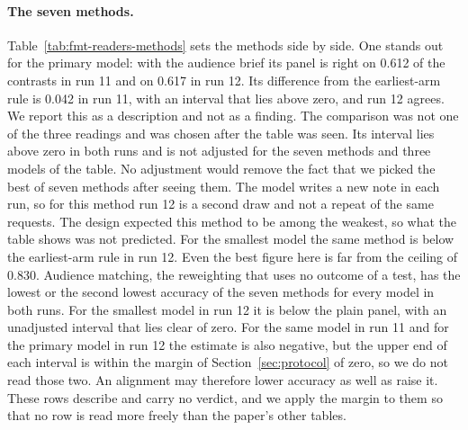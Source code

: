 \paragraph{The seven methods.} Table~\ref{tab:fmt-readers-methods} sets the methods side by side. One stands out for the primary model: with the audience brief its panel is right on 0.612 of the contrasts in run 11 and on 0.617 in run 12. Its difference from the earliest-arm rule is 0.042 in run 11, with an interval that lies above zero, and run 12 agrees. We report this as a description and not as a finding. The comparison was not one of the three readings and was chosen after the table was seen. Its interval lies above zero in both runs and is not adjusted for the seven methods and three models of the table. No adjustment would remove the fact that we picked the best of seven methods after seeing them. The model writes a new note in each run, so for this method run 12 is a second draw and not a repeat of the same requests. The design expected this method to be among the weakest, so what the table shows was not predicted. For the smallest model the same method is below the earliest-arm rule in run 12. Even the best figure here is far from the ceiling of 0.830. Audience matching, the reweighting that uses no outcome of a test, has the lowest or the second lowest accuracy of the seven methods for every model in both runs. For the smallest model in run 12 it is below the plain panel, with an unadjusted interval that lies clear of zero. For the same model in run 11 and for the primary model in run 12 the estimate is also negative, but the upper end of each interval is within the margin of Section~\ref{sec:protocol} of zero, so we do not read those two. An alignment may therefore lower accuracy as well as raise it. These rows describe and carry no verdict, and we apply the margin to them so that no row is read more freely than the paper's other tables.

